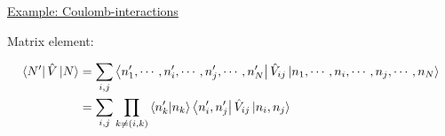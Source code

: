 \noindent \uline{Example: Coulomb-interactions}

\noindent Matrix element:

\begin{align}
	\bra{N'} \hat{V} \ket{N} &= \sum_{i,j} \bra{n'_1, \cdots , n'_i, \cdots, n'_j, \cdots, n'_N} \hat{V}_{ij} \ket{n_1, \cdots , n_i, \cdots, n_j, \cdots, n_N}\\
	&= \sum_{i,j} \prod_{k\neq (i,k)} \braket{n'_k}{n_k} \bra{n'_i, n'_j} \hat{V}_{ij} \ket{n_i, n_j}
\end{align}
















